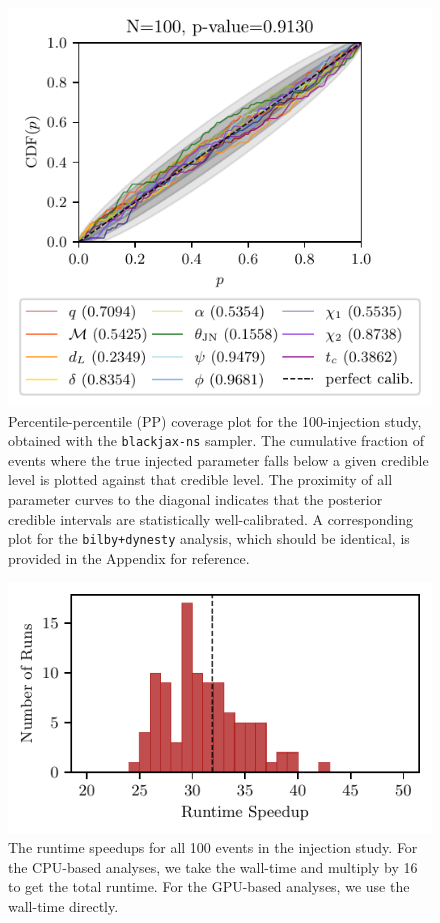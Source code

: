 \documentclass[fleqn,usenatbib]{mnras}
\begin{document}
\begin{figure}
    \centering
    \includegraphics[width=\columnwidth]{figures/pp_coverage_blackjax.pdf}
    \caption{Percentile-percentile (PP) coverage plot for the
    100-injection study, obtained with the \texttt{blackjax-ns}
    sampler. The cumulative fraction of events where the true
    injected parameter falls below a given credible level is plotted
    against that credible level. The proximity of all parameter curves
    to the diagonal indicates that the posterior credible intervals
    are statistically well-calibrated. A corresponding plot for the
    \texttt{bilby+dynesty} analysis, which should be identical,
    is provided in the Appendix for reference.}
    \label{fig:pp_coverage}
\end{figure}

\begin{figure}
    \centering
    \includegraphics{figures/walltime_speedup.pdf}
    \caption{The runtime speedups for all 100 events in the injection study. For the
    CPU-based analyses, we take the wall-time and multiply by 16 to get the total runtime. 
    For the GPU-based analyses, we use the wall-time directly.}
    \label{fig:speedup_comparison}
\end{figure}
\end{document}
